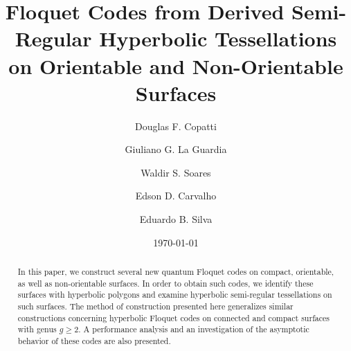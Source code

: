 \documentclass[%
reprint,
amsmath,amssymb,
aps,
]{revtex4-2}
\begin{document}
	
	
	\title{Floquet Codes from Derived Semi-Regular Hyperbolic Tessellations \\ on Orientable and Non-Orientable Surfaces}%
	
	\author{Douglas F. Copatti}

	\author{Giuliano G. La Guardia}%
	
	
	\author{Waldir S. Soares}
	
	\author{Edson D. Carvalho}
	

\author{Eduardo B. Silva}
	
	\date{\today}%
	
	\begin{abstract}
In this paper, we construct several new quantum Floquet codes on compact, orientable, as well as non-orientable surfaces. In order to obtain such codes, we identify these surfaces with hyperbolic polygons and examine hyperbolic semi-regular tessellations on such surfaces. The method of construction presented here generalizes similar constructions concerning hyperbolic Floquet codes on connected and compact surfaces with genus $g \geq 2$. A performance analysis and an investigation of the asymptotic behavior of these codes are also presented.
	\end{abstract}
	
\end{document}

